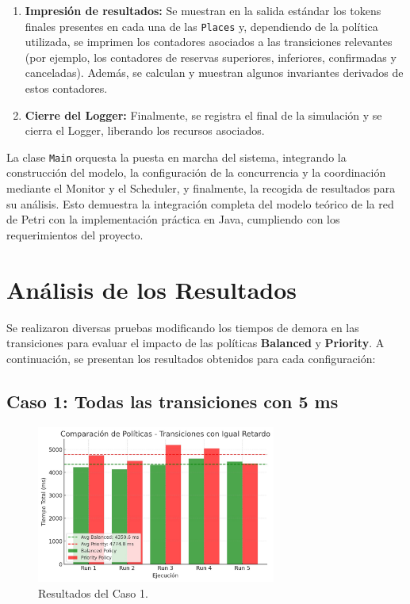 \documentclass[12pt]{article}
\begin{document}
\begin{enumerate}
    \item \textbf{Impresión de resultados:}  
    Se muestran en la salida estándar los tokens finales presentes en cada una de las \texttt{Places} y, dependiendo de la política utilizada, se imprimen los contadores asociados a las transiciones relevantes (por ejemplo, los contadores de reservas superiores, inferiores, confirmadas y canceladas). Además, se calculan y muestran algunos invariantes derivados de estos contadores.

    \item \textbf{Cierre del Logger:}  
    Finalmente, se registra el final de la simulación y se cierra el Logger, liberando los recursos asociados.
\end{enumerate}

La clase \texttt{Main} orquesta la puesta en marcha del sistema, integrando la construcción del modelo, la configuración de la concurrencia y la coordinación mediante el Monitor y el Scheduler, y finalmente, la recogida de resultados para su análisis. Esto demuestra la integración completa del modelo teórico de la red de Petri con la implementación práctica en Java, cumpliendo con los requerimientos del proyecto.
\newpage

\section{Análisis de los Resultados}

Se realizaron diversas pruebas modificando los tiempos de demora en las transiciones para evaluar el impacto de las políticas \textbf{Balanced} y \textbf{Priority}. A continuación, se presentan los resultados obtenidos para cada configuración:

\subsection{Caso 1: Todas las transiciones con 5 ms}

\begin{figure}[H]
    \centering
    \includegraphics[width=0.7\textwidth]{CASO_1.jpeg}
    \caption{Resultados del Caso 1.}
\end{figure}
\end{document}
